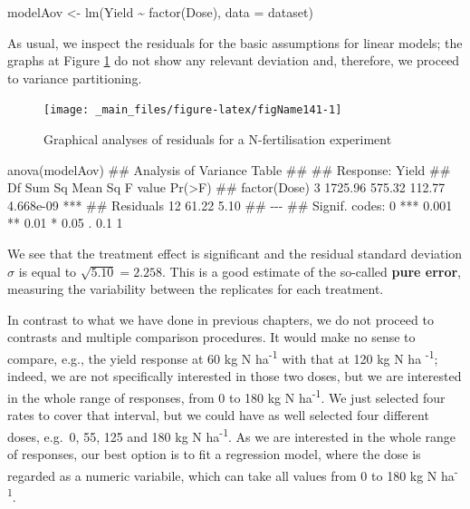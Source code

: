 \documentclass[a4paper,12pt,oneside]{book}
\newenvironment{Shaded}{\begin{snugshade}}{\end{snugshade}}
\newcommand{\SpecialCharTok}[1]{#1}
\newcommand{\DocumentationTok}[1]{#1}
\newcommand{\OtherTok}[1]{#1}
\newcommand{\FunctionTok}[1]{#1}
\newcommand{\AttributeTok}[1]{#1}
\newcommand{\NormalTok}[1]{#1}
\begin{document}
\begin{Shaded}
\begin{Highlighting}[]
\NormalTok{modelAov }\OtherTok{\textless{}{-}} \FunctionTok{lm}\NormalTok{(Yield }\SpecialCharTok{\textasciitilde{}} \FunctionTok{factor}\NormalTok{(Dose), }\AttributeTok{data =}\NormalTok{ dataset)}
\end{Highlighting}
\end{Shaded}

As usual, we inspect the residuals for the basic assumptions for linear models; the graphs at Figure \ref{fig:figName141} do not show any relevant deviation and, therefore, we proceed to variance partitioning.

\begin{figure}

{\centering \texttt{[image: \_main\_files/figure-latex/figName141-1]} 

}

\caption{Graphical analyses of residuals for a N-fertilisation experiment}\label{fig:figName141}
\end{figure}

\begin{Shaded}
\begin{Highlighting}[]
\FunctionTok{anova}\NormalTok{(modelAov)}
\DocumentationTok{\#\# Analysis of Variance Table}
\DocumentationTok{\#\# }
\DocumentationTok{\#\# Response: Yield}
\DocumentationTok{\#\#              Df  Sum Sq Mean Sq F value    Pr(\textgreater{}F)    }
\DocumentationTok{\#\# factor(Dose)  3 1725.96  575.32  112.77 4.668e{-}09 ***}
\DocumentationTok{\#\# Residuals    12   61.22    5.10                      }
\DocumentationTok{\#\# {-}{-}{-}}
\DocumentationTok{\#\# Signif. codes:  0 \textquotesingle{}***\textquotesingle{} 0.001 \textquotesingle{}**\textquotesingle{} 0.01 \textquotesingle{}*\textquotesingle{} 0.05 \textquotesingle{}.\textquotesingle{} 0.1 \textquotesingle{} \textquotesingle{} 1}
\end{Highlighting}
\end{Shaded}

We see that the treatment effect is significant and the residual standard deviation \(\sigma\) is equal to \(\sqrt{5.10} = 2.258\). This is a good estimate of the so-called \textbf{pure error}, measuring the variability between the replicates for each treatment.

In contrast to what we have done in previous chapters, we do not proceed to contrasts and multiple comparison procedures. It would make no sense to compare, e.g., the yield response at 60 kg N ha\textsuperscript{-1} with that at 120 kg N ha \textsuperscript{-1}; indeed, we are not specifically interested in those two doses, but we are interested in the whole range of responses, from 0 to 180 kg N ha\textsuperscript{-1}. We just selected four rates to cover that interval, but we could have as well selected four different doses, e.g.~0, 55, 125 and 180 kg N ha\textsuperscript{-1}. As we are interested in the whole range of responses, our best option is to fit a regression model, where the dose is regarded as a numeric variabile, which can take all values from 0 to 180 kg N ha\textsuperscript{-1}.
\end{document}
